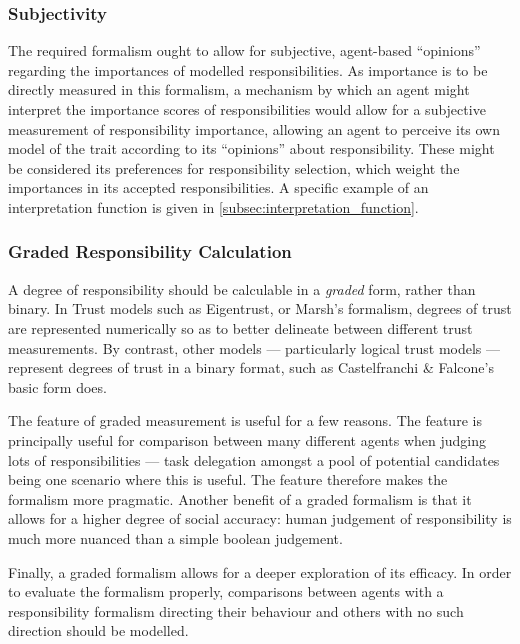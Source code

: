 \subsubsection{Subjectivity}
The required formalism ought to allow for subjective, agent-based ``opinions'' regarding the importances of modelled responsibilities. As importance is to be directly measured in this formalism, a mechanism by which an agent might interpret the importance scores of responsibilities would allow for a subjective measurement of responsibility importance, allowing an agent to perceive its own model of the trait according to its ``opinions'' about responsibility. These might be considered its preferences for responsibility selection, which weight the importances in its accepted responsibilities. A specific example of an interpretation function is given in \cref{subsec:interpretation_function}.\par

\subsubsection{Graded Responsibility Calculation}
A degree of responsibility should be calculable in a \emph{graded} form, rather than binary. In Trust models such as Eigentrust, or Marsh's formalism, degrees of trust are represented numerically so as to better delineate between different trust measurements. By contrast, other models --- particularly logical trust models --- represent degrees of trust in a binary format, such as Castelfranchi \& Falcone's basic form does.\par

The feature of graded measurement is useful for a few reasons. The feature is principally useful for comparison between many different agents when judging lots of responsibilities --- task delegation amongst a pool of potential candidates being one scenario where this is useful. The feature therefore makes the formalism more pragmatic. Another benefit of a graded formalism is that it allows for a higher degree of social accuracy: human judgement of responsibility is much more nuanced than a simple boolean judgement.\par

Finally, a graded formalism allows for a deeper exploration of its efficacy. In order to evaluate the formalism properly, comparisons between agents with a responsibility formalism directing their behaviour and others with no such direction should be modelled.\par

